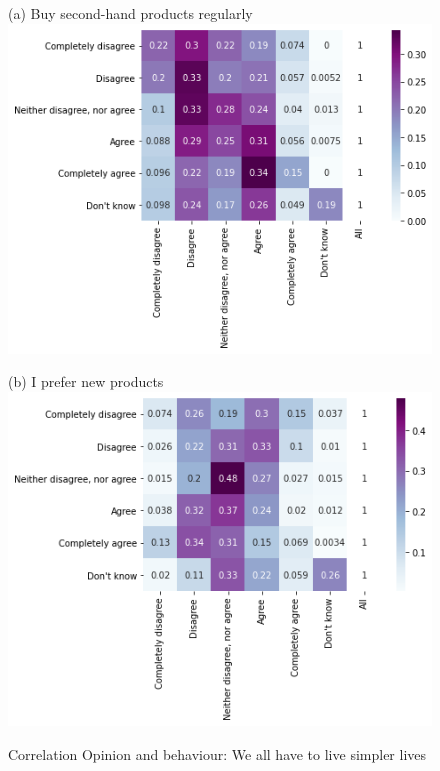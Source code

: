 \documentclass[12pt]{article}
\begin{document}
\begin{figure}[h!!]
	\centering	
	\caption{Correlation Opinion and behaviour: We all have to live simpler lives}\label{fig:behaviour_opinion:simpler}	
	\begin{minipage}[h!!]{0.32\textwidth}  
		\centering\footnotesize{(a) Buy second-hand products regularly}
		\includegraphics[width=1\textwidth]{../codding_data/results/liss/conditional_heatmap181_135labels0.png}
	\end{minipage}
	\begin{minipage}[h!!]{0.32\textwidth}
		\centering\footnotesize{(b) I prefer new products}
		\includegraphics[width=1\textwidth]{../codding_data/results/liss/conditional_heatmap181_148labels0.png}

\end{minipage}
\end{figure}
\end{document}

